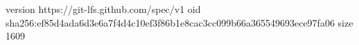 version https://git-lfs.github.com/spec/v1
oid sha256:ef85d4ada6d3e6a7f4d4c10ef3f86b1e8cac3cc099b66a365549693ece97fa06
size 1609
